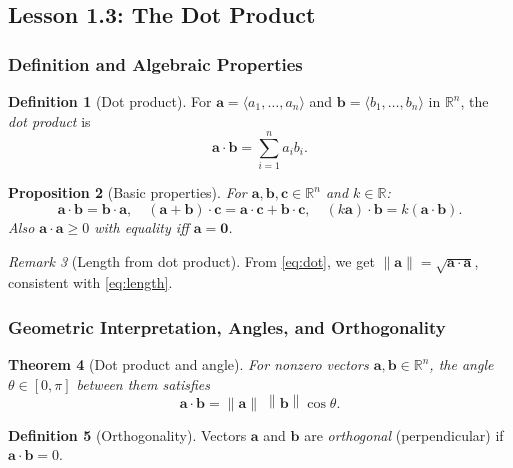 \documentclass[12pt]{article}
\numberwithin{equation}{section}
\newcommand{\RR}{\mathbb{R}}
\newcommand{\vect}[1]{\boldsymbol{#1}}   %
\newcommand{\norm}[1]{\left\lVert #1\right\rVert}
\theoremstyle{plain}
\newtheorem{theorem}{Theorem}[section]
\newtheorem{proposition}[theorem]{Proposition}
\theoremstyle{definition}
\newtheorem{definition}[theorem]{Definition}
\theoremstyle{remark}
\newtheorem{remark}[theorem]{Remark}
\begin{document}
\subsection{Lesson 1.3: The Dot Product}

\subsubsection{Definition and Algebraic Properties}

\begin{definition}[Dot product]
For $\vect{a}=\langle a_1,\dots,a_n\rangle$ and $\vect{b}=\langle b_1,\dots,b_n\rangle$ in $\RR^n$, the \emph{dot product} is
\begin{equation}\label{eq:dot}
\vect{a}\cdot\vect{b}=\sum_{i=1}^n a_i b_i.
\end{equation}
\end{definition}

\begin{proposition}[Basic properties]
For $\vect{a},\vect{b},\vect{c}\in\RR^n$ and $k\in\RR$:
\[
\vect{a}\cdot\vect{b}=\vect{b}\cdot\vect{a},\quad
(\vect{a}+\vect{b})\cdot\vect{c}=\vect{a}\cdot\vect{c}+\vect{b}\cdot\vect{c},\quad
(k\vect{a})\cdot\vect{b}=k(\vect{a}\cdot\vect{b}).
\]
Also $\vect{a}\cdot\vect{a}\ge 0$ with equality iff $\vect{a}=\vect{0}$.
\end{proposition}

\begin{remark}[Length from dot product]
From \cref{eq:dot}, we get $\norm{\vect{a}}=\sqrt{\vect{a}\cdot\vect{a}}$, consistent with \cref{eq:length}.
\end{remark}

\subsubsection{Geometric Interpretation, Angles, and Orthogonality}

\begin{theorem}[Dot product and angle]\label{thm:dot-angle}
For nonzero vectors $\vect{a},\vect{b}\in\RR^n$, the angle $\theta\in[0,\pi]$ between them satisfies
\begin{equation}\label{eq:dot-angle}
\vect{a}\cdot\vect{b}=\norm{\vect{a}}\;\norm{\vect{b}}\cos\theta.
\end{equation}
\end{theorem}

\begin{definition}[Orthogonality]
Vectors $\vect{a}$ and $\vect{b}$ are \emph{orthogonal} (perpendicular) if $\vect{a}\cdot\vect{b}=0$.
\end{definition}
\end{document}
